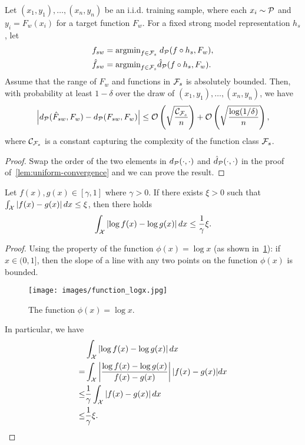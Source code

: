 \begin{lemma}
\label{lem:uniform-convergence-rev}
Let $(x_1,y_1),\dots,(x_n, y_n)$ be an i.i.d. training sample, where each $x_i \sim \mathcal{P}$ and $y_i = F_w(x_i)$ for a target function $F_w$. For a fixed strong model representation $h_s$, let 
\begin{align*}
    & f_{sw} = \text{argmin}_{f \in \mathcal{F}_{s}}\; d_\mathcal{P}(f \circ h_s, F_w),
    \\ & \hat{f}_{sw} = \text{argmin}_{f \in \mathcal{F}_s} \hat{d}_\mathcal{P}(f \circ h_s, F_w).
\end{align*}
Assume that the range of $F_w$ and functions in $\mathcal{F}_s$ is absolutely bounded. Then, with probability at least $1-\delta$ over the draw of $(x_1,y_1),\dots,(x_n, y_n)$, we have
\begin{align*}
    \left|d_{\mathcal{P}}(\hat{F}_{sw}, F_w) - d_{\mathcal{P}}(F_{sw}, F_w) \right| \le \mathcal{O}\left(\sqrt{\frac{\mathcal{C}_{\mathcal{F}_s}}{n}}\right) + \mathcal{O}\left(\sqrt{\frac{\log(1/\delta)}{n}}\right),
\end{align*}
where $\mathcal{C}_{\mathcal{F}_s}$ is a constant capturing the complexity of the function class $\mathcal{F}_s$.
\end{lemma}

\begin{proof}
    Swap the order of the two elements in $d_\mathcal{P}(\cdot, \cdot)$ and $\hat{d}_{\mathcal{P}}(\cdot, \cdot)$ in the proof of~\cref{lem:uniform-convergence} and we can prove the result.
\end{proof}







\begin{claim} \label{claim_xlnx}
Let $f(x), g(x) \in [\gamma,1]$ where $\gamma>0$. If there exists $\xi>0$ such that $\int_{\mathcal{X}} \left|f(x)-g(x) \right| d x \le \xi$,
then there holds
$$\int_{\mathcal{X}} \left| \log f(x)- \log g(x) \right| d x \le \frac{1}{\gamma}\xi.$$
\end{claim}


\begin{proof}


Using the property of the function $\phi(x)=\log x$ (as shown in~\cref{fig:function_xlogx}):
if $x \in (0,1]$, then the slope of a line with any two points on the function $\phi(x)$ is bounded.
\begin{figure}[ht]
    \centering
    \texttt{[image: images/function\_logx.jpg]}
    \caption{The function $\phi(x)= \log x$.}
    \label{fig:function_xlogx}
\end{figure}


In particular, we have
\begin{align*}
    & \int_{\mathcal{X}} \left|\log f(x)-\log g(x) \right| d x \nonumber \\ = & \int_{\mathcal{X}} \left|\frac{\log f(x)-\log g(x) }{f(x)-g(x)}\right| |f(x)-g(x)| d x \nonumber \\ \le & \frac{1}{\gamma} \int_{\mathcal{X}} \left|f(x)-g(x) \right| d x \nonumber \\ \le & \frac{1}{\gamma} \xi.
\end{align*}
\end{proof}




